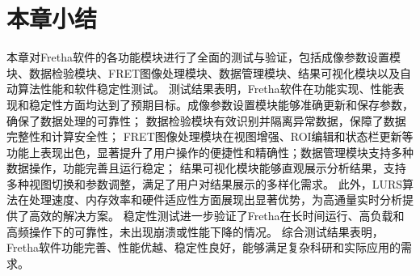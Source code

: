 \section{本章小结}

本章对Fretha软件的各功能模块进行了全面的测试与验证，包括成像参数设置模块、数据检验模块、FRET图像处理模块、数据管理模块、结果可视化模块以及自动算法性能和软件稳定性测试。
测试结果表明，Fretha软件在功能实现、性能表现和稳定性方面均达到了预期目标。成像参数设置模块能够准确更新和保存参数，确保了数据处理的可靠性；
数据检验模块有效识别并隔离异常数据，保障了数据完整性和计算安全性；
FRET图像处理模块在视图增强、ROI编辑和状态栏更新等功能上表现出色，显著提升了用户操作的便捷性和精确性；数据管理模块支持多种数据操作，功能完善且运行稳定；
结果可视化模块能够直观展示分析结果，支持多种视图切换和参数调整，满足了用户对结果展示的多样化需求。
此外，LURS算法在处理速度、内存效率和硬件适应性方面展现出显著优势，为高通量实时分析提供了高效的解决方案。
稳定性测试进一步验证了Fretha在长时间运行、高负载和高频操作下的可靠性，未出现崩溃或性能下降的情况。
综合测试结果表明，Fretha软件功能完善、性能优越、稳定性良好，能够满足复杂科研和实际应用的需求。